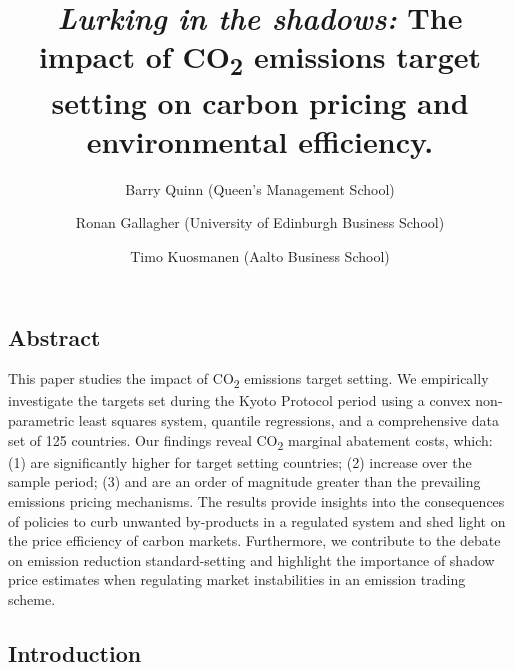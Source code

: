 \documentclass[
  letterpaper,
  DIV=11,
  numbers=noendperiod]{scrartcl}
\title{\emph{Lurking in the shadows:} The impact of CO\textsubscript{2}
emissions target setting on carbon pricing and environmental
efficiency.}
\author{Barry Quinn (Queen's Management School) \and Ronan Gallagher
(University of Edinburgh Business School) \and Timo Kuosmanen (Aalto
Business School)}
\date{}
\begin{document}
\maketitle

\ifdefined\Shaded\renewenvironment{Shaded}{\begin{tcolorbox}[boxrule=0pt, sharp corners, interior hidden, borderline west={3pt}{0pt}{shadecolor}, enhanced, frame hidden, breakable]}{\end{tcolorbox}}\fi

\hypertarget{abstract}{%
\subsection{Abstract}\label{abstract}}

This paper studies the impact of CO\textsubscript{2} emissions target
setting. We empirically investigate the targets set during the Kyoto
Protocol period using a convex non-parametric least squares system,
quantile regressions, and a comprehensive data set of 125 countries. Our
findings reveal CO\textsubscript{2} marginal abatement costs, which: (1)
are significantly higher for target setting countries; (2) increase over
the sample period; (3) and are an order of magnitude greater than the
prevailing emissions pricing mechanisms. The results provide insights
into the consequences of policies to curb unwanted by-products in a
regulated system and shed light on the price efficiency of carbon
markets. Furthermore, we contribute to the debate on emission reduction
standard-setting and highlight the importance of shadow price estimates
when regulating market instabilities in an emission trading scheme.

\hypertarget{introduction}{%
\subsection{Introduction}\label{introduction}}
\end{document}
